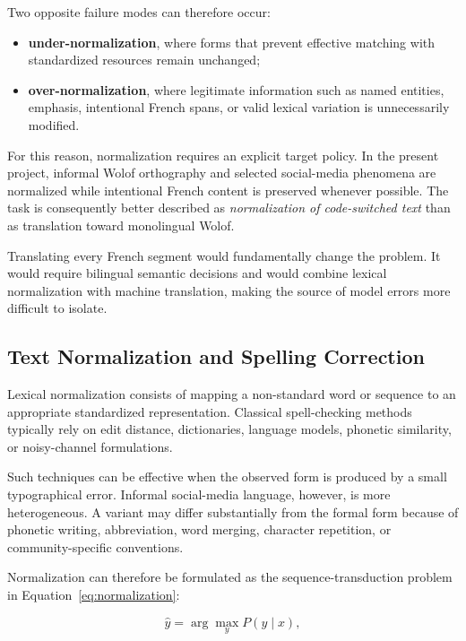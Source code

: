 \documentclass[12pt, a4paper, twoside, openany]{report}
\begin{document}
Two opposite failure modes can therefore occur:

\begin{itemize}
	\item \textbf{under-normalization}, where forms that prevent effective matching with standardized resources remain unchanged;

	\item \textbf{over-normalization}, where legitimate information such as named entities, emphasis, intentional French spans, or valid lexical variation is unnecessarily modified.
\end{itemize}

For this reason, normalization requires an explicit target policy. In the present project, informal Wolof orthography and selected social-media phenomena are normalized while intentional French content is preserved whenever possible. The task is consequently better described as \emph{normalization of code-switched text} than as translation toward monolingual Wolof.

Translating every French segment would fundamentally change the problem. It would require bilingual semantic decisions and would combine lexical normalization with machine translation, making the source of model errors more difficult to isolate.


\subsection{Text Normalization and Spelling Correction}

Lexical normalization consists of mapping a non-standard word or sequence to an appropriate standardized representation. Classical spell-checking methods typically rely on edit distance, dictionaries, language models, phonetic similarity, or noisy-channel formulations.

Such techniques can be effective when the observed form is produced by a small typographical error. Informal social-media language, however, is more heterogeneous. A variant may differ substantially from the formal form because of phonetic writing, abbreviation, word merging, character repetition, or community-specific conventions.

Normalization can therefore be formulated as the sequence-transduction problem in Equation~\eqref{eq:normalization}:

\begin{equation}
	\hat{y} = \arg\max_y P(y \mid x),
	\label{eq:normalization}
\end{equation}
\end{document}
